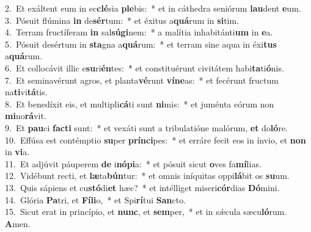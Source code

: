 {2.~}Et exáltent eum in ec\textbf{clé}sia \textbf{ple}bis:~* et in cáthedra seniórum \textbf{lau}dent \textbf{e}um.\\
{3.~}Pósuit flúmina \textbf{in} de\textbf{sér}tum:~* et éxitus a\textbf{quá}rum in \textbf{si}tim.\\
{4.~}Terram fructíferam \textbf{in} sal\textbf{sú}\textbf{gi}nem:~* a malítia inhabitánti\textbf{um} in \textbf{e}a.\\
{5.~}Pósuit desértum in \textbf{sta}gna a\textbf{quá}rum:~* et terram sine aqua in éxi\textbf{tus} a\textbf{quá}rum.\\
{6.~}Et collocávit illic e\textbf{su}ri\textbf{én}tes:~* et constituérunt civitátem habi\textbf{ta}ti\textbf{ó}nis.\\
{7.~}Et seminavérunt agros, et planta\textbf{vé}runt \textbf{ví}\textbf{ne}as:~* et fecérunt fructum na\textbf{ti}vi\textbf{tá}tis.\\
{8.~}Et benedíxit eis, et multipli\textbf{cá}ti sunt \textbf{ni}mis:~* et juménta eórum non \textbf{mi}no\textbf{rá}vit.\\
{9.~}Et \textbf{pau}ci \textbf{fa}\textbf{cti} sunt:~* et vexáti sunt a tribulatióne malórum, \textbf{et} do\textbf{ló}re.\\
{10.~}Effúsa est contémptio \textbf{su}per \textbf{prín}\textbf{ci}pes:~* et erráre fecit eos in ínvio, et \textbf{non} in \textbf{vi}a.\\
{11.~}Et adjúvit páuperem \textbf{de} i\textbf{nó}\textbf{pi}a:~* et pósuit sicut \textbf{o}ves fa\textbf{mí}lias.\\
{12.~}Vidébunt recti, et \textbf{læ}ta\textbf{bún}tur:~* et omnis iníquitas oppi\textbf{lá}bit os \textbf{su}um.\\
{13.~}Quis sápiens et cu\textbf{stó}di\textbf{et} hæc?~* et intélliget miseri\textbf{cór}dias \textbf{Dó}mini.\\
{14.~}Glória \textbf{Pa}tri, et \textbf{Fí}\textbf{li}o,~* et Spi\textbf{rí}tui \textbf{San}cto.\\
{15.~}Sicut erat in princípio, et \textbf{nunc}, et \textbf{sem}per,~* et in sǽcula sæcu\textbf{ló}rum. \textbf{A}men.\\

